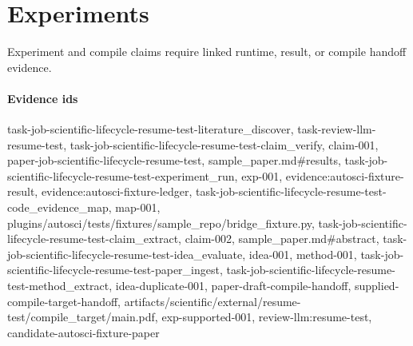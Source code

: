 \section{Experiments}
Experiment and compile claims require linked runtime, result, or compile handoff evidence.

\paragraph{Evidence ids} task-job-scientific-lifecycle-resume-test-literature\_discover, task-review-llm-resume-test, task-job-scientific-lifecycle-resume-test-claim\_verify, claim-001, paper-job-scientific-lifecycle-resume-test, sample\_paper.md\#results, task-job-scientific-lifecycle-resume-test-experiment\_run, exp-001, evidence:autosci-fixture-result, evidence:autosci-fixture-ledger, task-job-scientific-lifecycle-resume-test-code\_evidence\_map, map-001, plugins/autosci/tests/fixtures/sample\_repo/bridge\_fixture.py, task-job-scientific-lifecycle-resume-test-claim\_extract, claim-002, sample\_paper.md\#abstract, task-job-scientific-lifecycle-resume-test-idea\_evaluate, idea-001, method-001, task-job-scientific-lifecycle-resume-test-paper\_ingest, task-job-scientific-lifecycle-resume-test-method\_extract, idea-duplicate-001, paper-draft-compile-handoff, supplied-compile-target-handoff, artifacts/scientific/external/resume-test/compile\_target/main.pdf, exp-supported-001, review-llm:resume-test, candidate-autosci-fixture-paper
